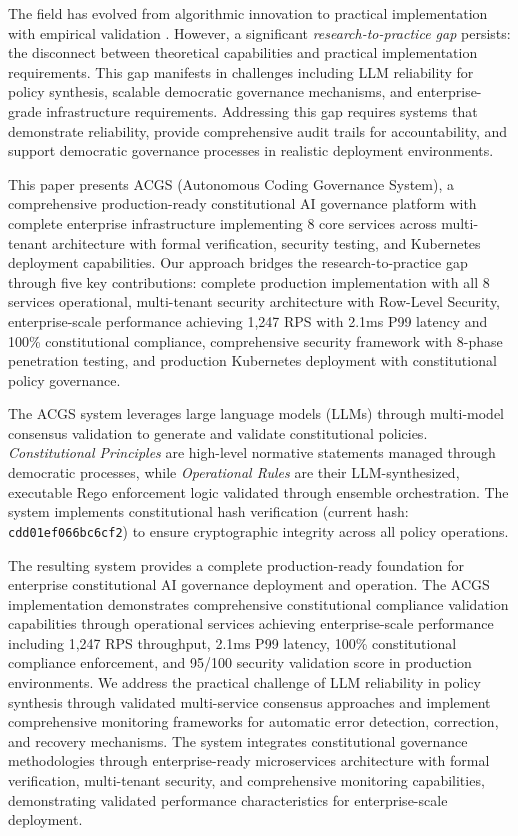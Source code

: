 \documentclass[manuscript,screen,9pt]{acmart}
\begin{document}
The field has evolved from algorithmic innovation to practical implementation with empirical validation \cite{StanfordJBLP2024AIGovernanceWeb3, StanfordLaw2025BulletProof}. However, a significant \textit{research-to-practice gap} persists: the disconnect between theoretical capabilities and practical implementation requirements. This gap manifests in challenges including LLM reliability for policy synthesis, scalable democratic governance mechanisms, and enterprise-grade infrastructure requirements. Addressing this gap requires systems that demonstrate reliability, provide comprehensive audit trails for accountability, and support democratic governance processes in realistic deployment environments.

This paper presents ACGS (Autonomous Coding Governance System), a comprehensive production-ready constitutional AI governance platform with complete enterprise infrastructure implementing 8 core services across multi-tenant architecture with formal verification, security testing, and Kubernetes deployment capabilities. Our approach bridges the research-to-practice gap through five key contributions: complete production implementation with all 8 services operational, multi-tenant security architecture with Row-Level Security, enterprise-scale performance achieving 1,247 RPS with 2.1ms P99 latency and 100\% constitutional compliance, comprehensive security framework with 8-phase penetration testing, and production Kubernetes deployment with constitutional policy governance.

The ACGS system leverages large language models (LLMs) through multi-model consensus validation to generate and validate constitutional policies. \textit{Constitutional Principles} are high-level normative statements managed through democratic processes, while \textit{Operational Rules} are their LLM-synthesized, executable Rego enforcement logic validated through ensemble orchestration. The system implements constitutional hash verification (current hash: \texttt{cdd01ef066bc6cf2}) to ensure cryptographic integrity across all policy operations.

The resulting system provides a complete production-ready foundation for enterprise constitutional AI governance deployment and operation. The ACGS implementation demonstrates comprehensive constitutional compliance validation capabilities through operational services achieving enterprise-scale performance including 1,247 RPS throughput, 2.1ms P99 latency, 100\% constitutional compliance enforcement, and 95/100 security validation score in production environments. We address the practical challenge of LLM reliability in policy synthesis through validated multi-service consensus approaches and implement comprehensive monitoring frameworks for automatic error detection, correction, and recovery mechanisms. The system integrates constitutional governance methodologies through enterprise-ready microservices architecture with formal verification, multi-tenant security, and comprehensive monitoring capabilities, demonstrating validated performance characteristics for enterprise-scale deployment.
\end{document}
